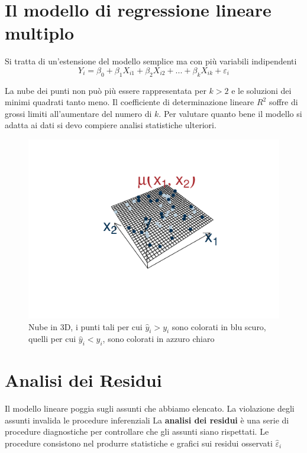 \documentclass[
  11pt,
]{book}
\theoremstyle{mytheoremstyle}
\theoremstyle{mydefstyle}
\begin{document}
\section{Il modello di regressione lineare multiplo}\label{il-modello-di-regressione-lineare-multiplo}

Si tratta di un'estensione del modello semplice ma con più variabili indipendenti
\[
Y_i=\beta_0+\beta_1X_{i1}+\beta_2X_{i2}+...+\beta_kX_{ik}+\varepsilon_i
\]

La nube dei punti non può più essere rappresentata per \(k>2\) e le soluzioni dei minimi quadrati
tanto meno.
Il coefficiente di determinazione lineare \(R^2\) soffre di grossi limiti all'aumentare del numero
di \(k\).
Per valutare quanto bene il modello si adatta ai dati si devo compiere analisi statistiche ulteriori.

\begin{figure}[H]

{\centering \includegraphics{Appunti_di_Statistica_2025_files/figure-latex/unnamed-chunk-15-1} 

}

\caption{Nube in 3D, i punti tali per cui $\hat y_i>y_i$ sono colorati in blu scuro, quelli per cui $\hat y_i<y_i$, sono colorati in azzuro chiaro}\label{fig:unnamed-chunk-15}
\end{figure}

\section{Analisi dei Residui}\label{analisi-dei-residui}

Il modello lineare poggia sugli assunti che abbiamo elencato.
La violazione degli assunti invalida le procedure inferenziali
La \textbf{analisi dei residui} è una serie di procedure diagnostiche per controllare
che gli assunti siano rispettati.
Le procedure consistono nel produrre statistiche e grafici sui residui osservati
\(\hat\varepsilon_i\)
\end{document}
